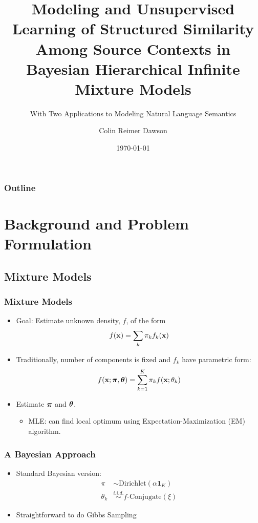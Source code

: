 \documentclass[11pt, serif, mathserif, table,trans]{beamer}
\title{Modeling and Unsupervised Learning of Structured Similarity Among
  Source Contexts in Bayesian Hierarchical Infinite Mixture Models}
\subtitle{With Two Applications to Modeling Natural Language Semantics}
\author{Colin Reimer Dawson}
\date{\today}
\begin{document}
\frame{\titlepage}



\begin{frame}
  \frametitle{Outline}
  \tableofcontents
\end{frame}

\section{Background and Problem Formulation}
\subsection{Mixture Models}
\label{sec:mixture-models}

\begin{frame}
  \frametitle{Mixture Models}  
  \begin{itemize}[<+->]
  \item Goal: Estimate unknown density, $f$, of the form
    \begin{equation}
      \label{eq:3}
      f(\mathbf{x}) = \sum_{k} \pi_k f_k(\mathbf{x})
    \end{equation}
  \item Traditionally, number of components is fixed and $f_k$ have parametric form:
    \begin{equation}
      \label{eq:4}
      f(\mathbf{x}; \boldsymbol{\pi}, \boldsymbol{\theta}) = \sum_{k=1}^K \pi_k f(\mathbf{x}; \theta_k)
    \end{equation}
  \item Estimate $\boldsymbol{\pi}$ and $\boldsymbol{\theta}$.
    \begin{itemize}
    \item MLE: can find local optimum using Expectation-Maximization
      (EM) algorithm.
    \end{itemize}
  \end{itemize}
\end{frame}

\begin{frame}
  \frametitle{A Bayesian Approach}
  \begin{itemize}
  \item Standard Bayesian version:
    \begin{align}
      \label{eq:5}
      \pi &\sim \mathrm{Dirichlet}(\alpha\mathbf{1}_K) \\
      \theta_k &\stackrel{i.i.d.}{\sim} f\text{-}\mathrm{Conjugate}(\xi)
    \end{align}
    \item Straightforward to do Gibbs Sampling
  \end{itemize}
\end{frame}
\end{document}
